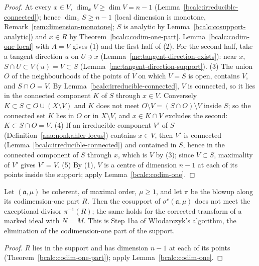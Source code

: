 \begin{proof}
\upstreamleanok
At every \(x\in V\), \(\dim_xV\ge\dim V=n-1\) (Lemma~\ref{bcalc:irreducible-connected}); hence \(\dim_xS\ge n-1\) (local dimension is monotone,
Remark~\ref{rem:dimension-monotone}; \(S\) is analytic by Lemma~\ref{bcalc:cosupport-analytic}) and \(x\in R\) by Theorem~\ref{bcalc:codim-one-part}.
Lemma~\ref{bcalc:codim-one-local} with \(A=V\) gives (1) and the first half of (2). For the second half, take a tangent direction \(u\) on \(U\ni x\)
(Lemma~\ref{mc:tangent-direction-exists}): near \(x\), \(S\cap U\subset V(u)=V\subset S\) (Lemma~\ref{mc:tangent-direction-support}). (3) The union \(O\)
of the neighbourhoods of the points of \(V\) on which \(V=S\) is open, contains \(V\), and \(S\cap O=V\). By Lemma~\ref{bcalc:irreducible-connected}, \(V\)
is connected, so it lies in the connected component \(K\) of \(S\) through \(x\in V\). Conversely \(K\subset S\subset O\cup(X\setminus V)\) and \(K\) does not
meet \(O\setminus V=(S\cap O)\setminus V\) inside \(S\); so the connected set \(K\) lies in \(O\) or in \(X\setminus V\), and \(x\in K\cap V\) excludes the second:
\(K\subset S\cap O=V\). (4) If an irreducible component \(V'\) of \(S\) (Definition~\ref{ana:nonkahler-locus}) contains \(x\in V\), then \(V'\) is connected
(Lemma~\ref{bcalc:irreducible-connected}) and contained in \(S\), hence in the connected component of \(S\) through \(x\), which is \(V\) by (3); since
\(V\subset S\), maximality of \(V'\) gives \(V'=V\). (5) By (1), \(V\) is a centre of dimension \(n-1\) at each of its points inside the support;
apply Lemma~\ref{bcalc:codim-one}.
\end{proof}

\begin{corollary}
\label{bcalc:codim-one-step}
\upstreamleanok
Let \((\mathfrak a,\mu)\) be coherent, of maximal order, \(\mu\ge1\), and let \(\pi\) be the blowup along its codimension-one part \(R\). Then the
cosupport of \(\sigma^{c}(\mathfrak a,\mu)\) does not meet the exceptional divisor \(\pi^{-1}(R)\); the same holds for the corrected transform of a marked
ideal with \(N=M\). This is Step 1ba of Włodarczyk's algorithm, the elimination of the codimension-one part of the support.
\end{corollary}
\begin{proof}
\upstreamleanok
\(R\) lies in the support and has dimension \(n-1\) at each of its points (Theorem~\ref{bcalc:codim-one-part}); apply Lemma~\ref{bcalc:codim-one}.
\end{proof}


